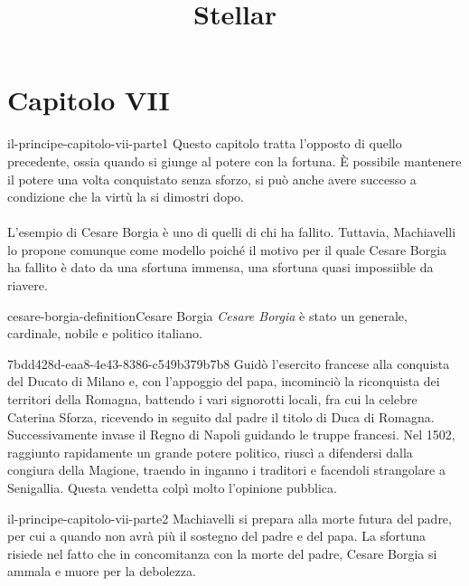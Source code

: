 \documentclass[preview]{standalone}
\begin{document}
\title{Stellar}
\genpage

\section{Capitolo VII}

\begin{snippet}{il-principe-capitolo-vii-parte1}
    Questo capitolo tratta l'opposto di quello precedente, ossia quando si giunge al potere
    con la fortuna.
    È possibile mantenere il potere una volta conquistato senza sforzo, si può
    anche avere successo a condizione che la virtù la si dimostri dopo.
    \\\\
    L'esempio di Cesare Borgia è uno di quelli di chi ha fallito.
    Tuttavia, Machiavelli lo propone comunque come modello poiché
    il motivo per il quale Cesare Borgia ha fallito è dato da una sfortuna immensa,
    una sfortuna quasi impossiible da riavere.
\end{snippet}

\begin{snippetdefinition}{cesare-borgia-definition}{Cesare Borgia}
    \textit{Cesare Borgia} è stato un generale, cardinale, nobile e politico italiano.
\end{snippetdefinition}

\begin{snippetnote}{7bdd428d-eaa8-4e43-8386-c549b379b7b8}{}%
    Guidò l'esercito francese alla conquista del Ducato di Milano e,
    con l'appoggio del papa, incominciò la riconquista dei territori della Romagna,
    battendo i vari signorotti locali, fra cui la celebre Caterina Sforza,
    ricevendo in seguito dal padre il titolo di Duca di Romagna.
    Successivamente invase il Regno di Napoli guidando le truppe francesi.
    Nel 1502, raggiunto rapidamente un grande potere politico,
    riuscì a difendersi dalla congiura della Magione,
    traendo in inganno i traditori e facendoli strangolare a Senigallia.
    Questa vendetta colpì molto l'opinione pubblica.
\end{snippetnote}

\begin{snippet}{il-principe-capitolo-vii-parte2}
    Machiavelli si prepara alla morte futura del padre, per cui a quando
    non avrà più il sostegno del padre e del papa.
    La sfortuna risiede nel fatto che in concomitanza con la morte del padre,
    Cesare Borgia si ammala e muore per la debolezza.
\end{snippet}
\end{document}
